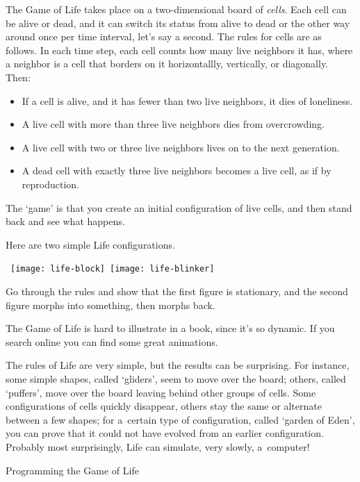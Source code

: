 The Game of Life takes place on
a two-dimensional board of \emph{cells}. Each cell can be
alive or dead, and it can switch its status from alive to dead
or the other way around once per time interval, let's say a second.
The rules for cells are as follows. In each time step, each cell
counts how many live neighbors it has, where a neighbor is a cell
that borders on it horizontallly, vertically, or diagonally. Then:
\begin{itemize}
\item If a cell is alive, and it has fewer than two live neighbors, it dies of loneliness.
\item A live cell with more than three live neighbors dies from overcrowding.
\item A live cell with two or three live neighbors lives on to the next generation.
\item A dead cell with exactly three live neighbors becomes a live cell, as if by reproduction.
\end{itemize}
The `game' is that you create an initial configuration of live cells, and then
stand back and see what happens. 
\begin{exercise}
  Here are two simple Life configurations.

  \ \hbox{\texttt{[image: life-block]} \texttt{[image: life-blinker]}}
  
  Go through the rules and show that the first figure is stationary,
  and the second figure morphs into something, then morphs back.
\end{exercise}
The Game of Life is hard to illustrate in a book, since it's so dynamic.
If you search online you can find some great animations.

The rules of Life are very simple, but the results can be surprising. For
instance, some simple shapes, called `gliders', seem to move over the
board; others, called `puffers', move over the board leaving behind
other groups of cells. Some configurations of cells quickly disappear,
others stay the same or alternate between a few shapes; for a~certain
type of configuration, called `garden of Eden', you can prove that it
could not have evolved from an earlier configuration. Probably most
surprisingly, Life can simulate, very slowly, a~computer!

 {Programming the Game of Life}

